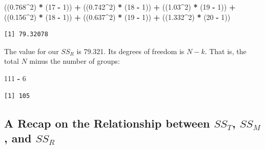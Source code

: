 \documentclass[
  11pt,
]{book}
\newenvironment{Shaded}{\begin{snugshade}}{\end{snugshade}}
\newcommand{\DecValTok}[1]{\textcolor[rgb]{0.06,0.06,0.06}{#1}}
\newcommand{\FloatTok}[1]{\textcolor[rgb]{0.06,0.06,0.06}{#1}}
\newcommand{\NormalTok}[1]{#1}
\newcommand{\SpecialCharTok}[1]{\textcolor[rgb]{0.43,0.43,0.43}{\textbf{#1}}}
\begin{document}
\begin{Shaded}
\begin{Highlighting}[]
\NormalTok{((}\FloatTok{0.768}\SpecialCharTok{\^{}}\DecValTok{2}\NormalTok{) }\SpecialCharTok{*}\NormalTok{ (}\DecValTok{17} \SpecialCharTok{{-}} \DecValTok{1}\NormalTok{)) }\SpecialCharTok{+}\NormalTok{ ((}\FloatTok{0.742}\SpecialCharTok{\^{}}\DecValTok{2}\NormalTok{) }\SpecialCharTok{*}\NormalTok{ (}\DecValTok{18} \SpecialCharTok{{-}} \DecValTok{1}\NormalTok{)) }\SpecialCharTok{+}\NormalTok{ ((}\FloatTok{1.03}\SpecialCharTok{\^{}}\DecValTok{2}\NormalTok{) }\SpecialCharTok{*}\NormalTok{ (}\DecValTok{19} \SpecialCharTok{{-}} \DecValTok{1}\NormalTok{)) }\SpecialCharTok{+}
\NormalTok{    ((}\FloatTok{0.156}\SpecialCharTok{\^{}}\DecValTok{2}\NormalTok{) }\SpecialCharTok{*}\NormalTok{ (}\DecValTok{18} \SpecialCharTok{{-}} \DecValTok{1}\NormalTok{)) }\SpecialCharTok{+}\NormalTok{ ((}\FloatTok{0.637}\SpecialCharTok{\^{}}\DecValTok{2}\NormalTok{) }\SpecialCharTok{*}\NormalTok{ (}\DecValTok{19} \SpecialCharTok{{-}} \DecValTok{1}\NormalTok{)) }\SpecialCharTok{+}\NormalTok{ ((}\FloatTok{1.332}\SpecialCharTok{\^{}}\DecValTok{2}\NormalTok{) }\SpecialCharTok{*}\NormalTok{ (}\DecValTok{20} \SpecialCharTok{{-}}
    \DecValTok{1}\NormalTok{))}
\end{Highlighting}
\end{Shaded}

\begin{verbatim}
[1] 79.32078
\end{verbatim}

The value for our \(SS_R\) is 79.321. Its degrees of freedom is \(N - k\). That is, the total \(N\) minus the number of groups:

\begin{Shaded}
\begin{Highlighting}[]
\DecValTok{111} \SpecialCharTok{{-}} \DecValTok{6}
\end{Highlighting}
\end{Shaded}

\begin{verbatim}
[1] 105
\end{verbatim}

\hypertarget{a-recap-on-the-relationship-between-ss_t-ss_m-and-ss_r}{%
\subsection{\texorpdfstring{A Recap on the Relationship between \(SS_T\), \(SS_M\), and \(SS_R\)}{A Recap on the Relationship between SS\_T, SS\_M, and SS\_R}}\label{a-recap-on-the-relationship-between-ss_t-ss_m-and-ss_r}}
\end{document}
